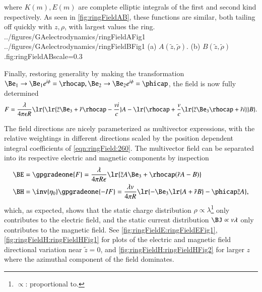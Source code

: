 where
\( K(m), E(m) \)
are complete elliptic integrals of the first and second kind respectively.
As seen in \cref{fig:ringFieldAB}, these functions are similar,
both tailing off quickly with \( z, \rho \), with largest values the ring.
\imageTwoFigures
{../figures/GAelectrodynamics/ringFieldAFig1}
{../figures/GAelectrodynamics/ringFieldBFig1}
{(a) \(A(\tilde{z}, \tilde{\rho})\).  (b) \(B(\tilde{z}, \tilde{\rho})\).}{fig:ringFieldAB}{scale=0.3}

Finally, restoring generality by making the
transformation \( \Be_1 \rightarrow \Be_1 e^{i \phi} = \rhocap, \Be_2 \rightarrow \Be_2 e^{i\phi} = \phicap \), the field is
now fully determined
\begin{dmath}\label{eqn:ringField:220}
F
=
\frac{\lambda}{4 \pi \epsilon R}
\lr{
\lr{ \tilde{z} \Be_3 + \tilde{r} \rhocap -\frac{v i}{c} } A
- \lr{
\rhocap + \frac{v}{c} \lr{ \tilde{z} \Be_{3} \rhocap + \tilde{r} i } } B
}.
\end{dmath}

The field directions are nicely parameterized as multivector expressions, with the relative weightings in different directions scaled by the position dependent integral coefficients of \cref{eqn:ringField:260}.
The multivector field can be separated into its respective electric and magnetic components by inspection
\begin{dmath}\label{eqn:ringField:240}
\begin{aligned}
\BE &=
\gpgradeone{F}
=
\frac{\lambda}{4 \pi R \epsilon} \lr{ \tilde{z} A \Be_3 + \rhocap( \tilde{r} A - B) } \\
\BH &=
\inv{\eta_0} \gpgradeone{-I F}
=
\frac{\lambda v}{4 \pi R } \lr{ -\Be_3 \lr{ A + \tilde{r} B } - \phicap \tilde{z} A },
\end{aligned}
\end{dmath}
\index{\(\propto\)}
which, as expected, shows that the static charge distribution \( \rho \propto \lambda \)\footnote{\(\propto\): proportional to.} only contributes to the electric field, and the static current distribution \( \BJ \propto v \lambda \) only contributes to the magnetic field.
See
\cref{fig:ringFieldE:ringFieldEFig1}, \cref{fig:ringFieldH:ringFieldHFig1}
for plots of the electric and magnetic field directional variation near \( \tilde{z} = 0 \), and \cref{fig:ringFieldH:ringFieldHFig2} for larger \( z \) where the azimuthal component of the field dominates.

